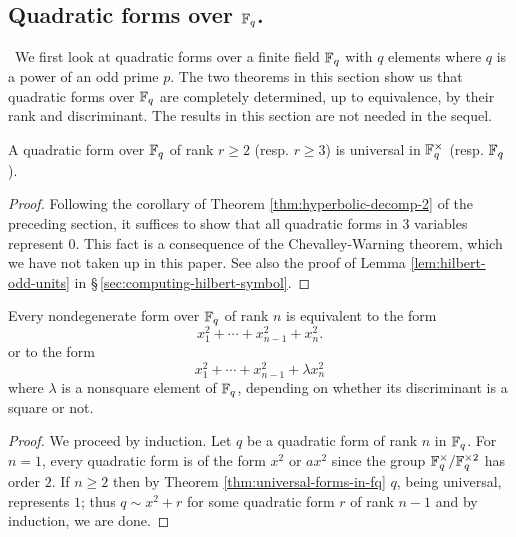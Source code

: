 \subsection{Quadratic forms over \(\mathbb{F}_q\).}~We first look at quadratic forms over a finite field \(\mathbb{F}_q\) with \(q\) elements where \(q\) is a power of an odd prime \(p\). The two theorems in this section show us that quadratic forms over \(\mathbb{F}_q\) are completely determined, up to equivalence, by their rank and discriminant. The results in this section are not needed in the sequel.\label{sec:quadratic-forms-fq}

\begin{theoremx}{\normalfont\cite[p.~34]{serre2012course}}
    A quadratic form over \(\mathbb{F}_q\) of rank \(r \geq 2\) (resp. \(r \geq 3\)) is universal in \(\mathbb{F}_q^\times\) (resp. \(\mathbb{F}_q\)).\label{thm:universal-forms-in-fq}
\end{theoremx}

\begin{proof}
    Following the corollary of Theorem \ref{thm:hyperbolic-decomp-2} of the preceding section, it suffices to show that all quadratic forms in \(3\) variables represent \(0\). This fact is a consequence of the Chevalley-Warning theorem, which we have not taken up in this paper. See also the proof of Lemma \ref{lem:hilbert-odd-units} in \S\,\ref{sec:computing-hilbert-symbol}. 
\end{proof}

\begin{theoremx}\label{thm:quadratic-forms-fq-rank-n}
    Every nondegenerate form over \(\mathbb{F}_q\) of rank \(n\) is equivalent to the form
    \[
        x_1^2 + \cdots + x_{n-1}^2 + x_n^2.
    \]
    or to the form
    \[
        x_1^2 + \cdots + x_{n-1}^2 + \lambda x_n^2
    \]
    where \(\lambda\) is a nonsquare element of \(\mathbb{F}_q\), depending on whether its discriminant is a square or not.
\end{theoremx}

\begin{proof}
    We proceed by induction. Let \(q\) be a quadratic form of rank \(n\) in \(\mathbb{F}_q\). For \(n = 1\), every quadratic form is of the form \(x^2\) or \(ax^2\) since the group \(\mathbb{F}_q^{\times} / \mathbb{F}_q^{\times2}\) has order \(2\). If \(n \geq 2\) then by Theorem \ref{thm:universal-forms-in-fq} \(q\), being universal, represents \(1\); thus \(q \sim x^2 + r\) for some quadratic form \(r\) of rank \(n - 1\) and by induction, we are done.
\end{proof}

